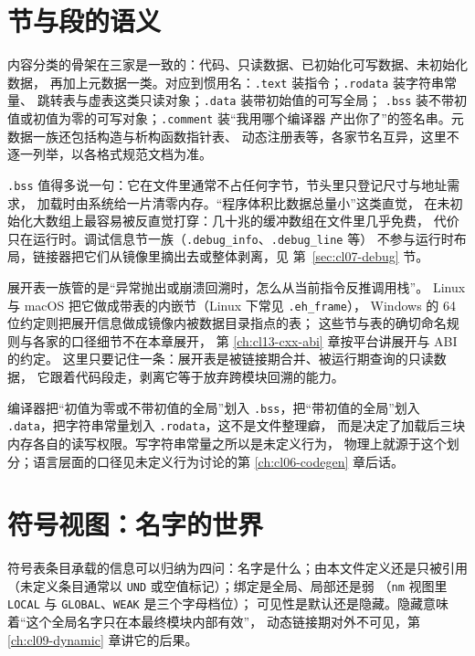 \documentclass[12pt,a4paper,fontset=fandol]{ctexbook}
\newcommand{\Tp}[1]{\texttt{#1}}
\newcommand{\Tool}[1]{\texttt{#1}}
\newcommand{\Sect}[1]{\texttt{.#1}}
\newcommand{\Nix}{\textsf{Linux}}
\newcommand{\Win}{\textsf{Windows}}
\newcommand{\Mac}{\textsf{macOS}}
\begin{document}
\section{节与段的语义}\label{sec:cl07-sections}

内容分类的骨架在三家是一致的：代码、只读数据、已初始化可写数据、未初始化数据，
再加上元数据一类。对应到惯用名：\Sect{text} 装指令；\Sect{rodata} 装字符串常量、
跳转表与虚表这类只读对象；\Sect{data} 装带初始值的可写全局；
\Sect{bss} 装不带初值或初值为零的可写对象；\Sect{comment} 装“我用哪个编译器
产出你了”的签名串。元数据一族还包括构造与析构函数指针表、
动态注册表等，各家节名互异，这里不逐一列举，以各格式规范文档为准。

\Sect{bss} 值得多说一句：它在文件里通常不占任何字节，节头里只登记尺寸与地址需求，
加载时由系统给一片清零内存。“程序体积比数据总量小”这类直觉，
在未初始化大数组上最容易被反直觉打穿：几十兆的缓冲数组在文件里几乎免费，
代价只在运行时。调试信息节一族（\Sect{debug\_info}、\Sect{debug\_line} 等）
不参与运行时布局，链接器把它们从镜像里摘出去或整体剥离，见 第~\ref{sec:cl07-debug} 节。

展开表一族管的是“异常抛出或崩溃回溯时，怎么从当前指令反推调用栈”。
\Nix{} 与 \Mac{} 把它做成带表的内嵌节（\Nix{} 下常见 \Sect{eh\_frame}），
\Win{} 的 64 位约定则把展开信息做成镜像内被数据目录指点的表；
这些节与表的确切命名规则与各家的口径细节不在本章展开，
第 \ref{ch:cl13-cxx-abi} 章按平台讲展开与 ABI 的约定。
这里只要记住一条：展开表是被链接期合并、被运行期查询的只读数据，
它跟着代码段走，剥离它等于放弃跨模块回溯的能力。

\begin{note}[title={权限与分段是一件事的两面}]
编译器把“初值为零或不带初值的全局”划入 \Sect{bss}，把“带初值的全局”划入
\Sect{data}，把字符串常量划入 \Sect{rodata}，这不是文件整理癖，
而是决定了加载后三块内存各自的读写权限。写字符串常量之所以是未定义行为，
物理上就源于这个划分；语言层面的口径见未定义行为讨论的第 \ref{ch:cl06-codegen} 章后话。
\end{note}

\section{符号视图：名字的世界}\label{sec:cl07-symbols}

符号表条目承载的信息可以归纳为四问：名字是什么；由本文件定义还是只被引用
（未定义条目通常以 \Tp{UND} 或空值标记）；绑定是全局、局部还是弱
（\Tool{nm} 视图里 \Tp{LOCAL} 与 \Tp{GLOBAL}、\Tp{WEAK} 是三个字母档位）；
可见性是默认还是隐藏。隐藏意味着“这个全局名字只在本最终模块内部有效”，
动态链接期对外不可见，第 \ref{ch:cl09-dynamic} 章讲它的后果。
\end{document}
